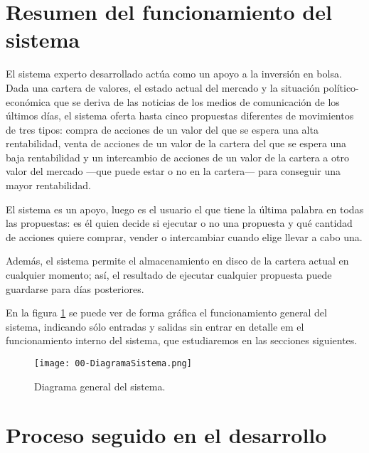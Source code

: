 \documentclass[a4paper, 11pt, titlepage]{article}
\begin{document}
    \maketitle

    \tableofcontents
    \newpage


    \section{Resumen del funcionamiento del sistema}

    El sistema experto desarrollado actúa como un apoyo a la inversión en bolsa. Dada una cartera de valores, el estado actual del mercado y la situación político-económica que se deriva de las noticias de los medios de comunicación de los últimos días, el sistema oferta hasta cinco propuestas diferentes de movimientos de tres tipos: compra de acciones de un valor del que se espera una alta rentabilidad, venta de acciones de un valor de la cartera del que se espera una baja rentabilidad y un intercambio de acciones de un valor de la cartera a otro valor del mercado ---que puede estar o no en la cartera--- para conseguir una mayor rentabilidad.

    El sistema es un apoyo, luego es el usuario el que tiene la última palabra en todas las propuestas: es él quien decide si ejecutar o no una propuesta y qué cantidad de acciones quiere comprar, vender o intercambiar cuando elige llevar a cabo una.

    Además, el sistema permite el almacenamiento en disco de la cartera actual en cualquier momento; así, el resultado de ejecutar cualquier propuesta puede guardarse para días posteriores.

    En la figura \ref{fig:diagrama} se puede ver de forma gráfica el funcionamiento general del sistema, indicando sólo entradas y salidas sin entrar en detalle em el funcionamiento interno del sistema, que estudiaremos en las secciones siguientes.
    \begin{center}
        \begin{figure}[!htb]
            \centering
            \texttt{[image: 00-DiagramaSistema.png]}
            \caption{Diagrama general del sistema.}
            \label{fig:diagrama}
        \end{figure}
    \end{center}


    \section{Proceso seguido en el desarrollo}
\end{document}
